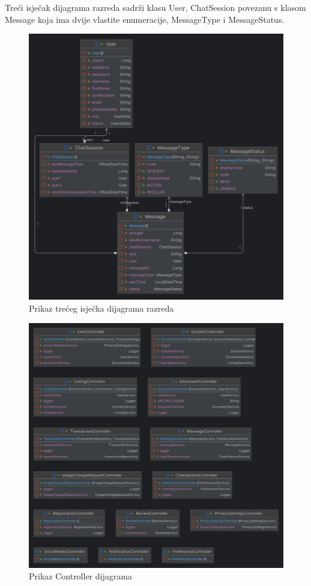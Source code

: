 Treći isječak dijagrama razreda sadrži klasu User, ChatSession povezanu s klasom Message koja ima dvije vlastite enumeracije, MessageType i MessageStatus.
\begin{figure} [H]

	\includegraphics[width=1\linewidth]{slike/ClassDiagram3.png}
	\centering
	\caption{Prikaz trećeg isječka dijagrama razreda}
	\label{fig:Prikaz trećeg isječka dijagrama razreda}
\end{figure}

\begin{figure} [H]

	\includegraphics[width=1\linewidth]{slike/ControllerDiagram.png}
	\centering
	\caption{Prikaz Controller dijagrama}
	\label{fig:Prikaz Controller dijagrama}
\end{figure}

